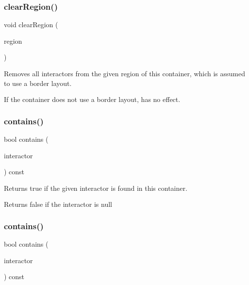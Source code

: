 \subsubsection{\texorpdfstring{clear\+Region()}{clearRegion()}\hspace{0.1cm}{\footnotesize\ttfamily [2/2]}}
{\footnotesize\ttfamily void clear\+Region (\begin{DoxyParamCaption}\item[{const std\+::string \&}]{region }\end{DoxyParamCaption})\hspace{0.3cm}{\ttfamily [virtual]}}



Removes all interactors from the given region of this container, which is assumed to use a border layout. 

If the container does not use a border layout, has no effect. \mbox{\label{classsgl_1_1GContainer_a29e67f98cd36414c67475b8941d861a6}} 
\subsubsection{\texorpdfstring{contains()}{contains()}\hspace{0.1cm}{\footnotesize\ttfamily [1/2]}}
{\footnotesize\ttfamily bool contains (\begin{DoxyParamCaption}\item[{\mbox{\hyperlink{classsgl_1_1GInteractor}{G\+Interactor}} $\ast$}]{interactor }\end{DoxyParamCaption}) const\hspace{0.3cm}{\ttfamily [virtual]}}



Returns true if the given interactor is found in this container. 

Returns false if the interactor is null \mbox{\label{classsgl_1_1GContainer_a62fe1c67f06f657fea8b9b28672516a0}} 
\subsubsection{\texorpdfstring{contains()}{contains()}\hspace{0.1cm}{\footnotesize\ttfamily [2/2]}}
{\footnotesize\ttfamily bool contains (\begin{DoxyParamCaption}\item[{\mbox{\hyperlink{classsgl_1_1GInteractor}{G\+Interactor}} \&}]{interactor }\end{DoxyParamCaption}) const\hspace{0.3cm}{\ttfamily [virtual]}}



